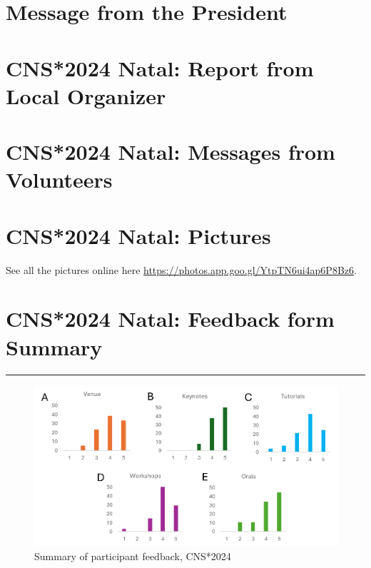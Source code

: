 \documentclass[11pt,a4paper,oneside]{article}
\begin{document}

\newpage

\pagestyle{fancy}
\fancyhead{}
\fancyfoot{}

\newpage
\section*{Message from the President}%

\lipsum[1-3]

\newpage
\section*{CNS*2024 Natal: Report from Local Organizer}%
\lipsum[1-3]

\newpage
\section*{CNS*2024 Natal: Messages from Volunteers}%
\lipsum[1-3]

\newpage
\section*{CNS*2024 Natal: Pictures}%
\sectionauthor{  }
See all the pictures online here \url{https://photos.app.goo.gl/YtpTN6ui4ap6P8Bz6}.

\newpage


\newpage
\section*{CNS*2024 Natal: Feedback form Summary}%
\rule{\textwidth}{0.4pt}
\begin{figure}[h]
  \centering
  \includegraphics[width=\textwidth]{images/cns2024-feedback-form-summary}
  \caption{Summary of participant feedback, CNS*2024}%
  \label{fig:cns2024-summary}
\end{figure}
\end{document}
